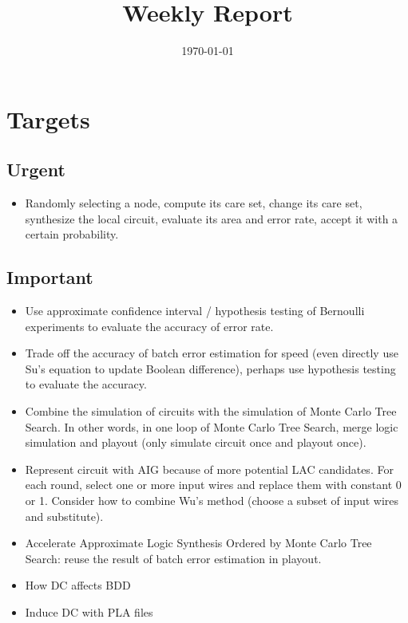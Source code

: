 \documentclass{article}
\title{Weekly Report}
\author{}
\date{\today}
\begin{document}
\maketitle

\section{Targets}

\subsection{Urgent}
\begin{itemize}
    \item Randomly selecting a node,
        compute its care set,
        change its care set,
        synthesize the local circuit,
        evaluate its area and error rate,
        accept it with a certain probability.
\end{itemize}

\subsection{Important}
\begin{itemize}
    \item Use approximate confidence interval / hypothesis testing of Bernoulli experiments to evaluate the accuracy of error rate.
    \item Trade off the accuracy of batch error estimation for speed
        (even directly use Su's equation to update Boolean difference),
        perhaps use hypothesis testing to evaluate the accuracy.
    \item Combine the simulation of circuits with the simulation of Monte Carlo Tree Search.
        In other words,
        in one loop of Monte Carlo Tree Search,
        merge logic simulation and playout (only simulate circuit once and playout once).
    \item Represent circuit with AIG because of more potential LAC candidates.
        For each round, select one or more input wires and replace them with constant 0 or 1.
        Consider how to combine Wu's method (choose a subset of input wires and substitute).
    \item Accelerate Approximate Logic Synthesis Ordered by Monte Carlo Tree Search:
        reuse the result of batch error estimation in playout.
    \item How DC affects BDD
    \item Induce DC with PLA files
\end{itemize}
\end{document}
